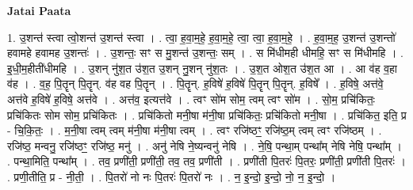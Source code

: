 \documentclass[17pt]{extarticle}
\begin{document}
\textbf{Jatai Paata} \newline

1. उ॒शन्त॑ स्त्वा त्वो॒शन्त॑ उ॒शन्त॑ स्त्वा । . त्वा॒ ह॒वा॒म॒हे॒ ह॒वा॒म॒हे॒ त्वा॒ त्वा॒ ह॒वा॒म॒हे॒ । . ह॒वा॒म॒ह॒ उ॒शन्त॑ उ॒शन्तो॑ हवामहे हवामह उ॒शन्तः॑ । . उ॒शन्तः॒ सꣳ स मु॒शन्त॑ उ॒शन्तः॒ सम् । . स मि॑धीमही धीमहि॒ सꣳ स मि॑धीमहि । . इ॒धी॒म॒हीती॑धीमहि । . उ॒शन् नु॑श॒त उ॑श॒त उ॒शन् नु॒शन् नु॑श॒तः । . उ॒श॒त ओश॒त उ॑श॒त आ । . आ व॑ह व॒हा व॑ह । . व॒ह॒ पि॒तॄन् पि॒तॄन्. व॑ह वह पि॒तॄन् । . पि॒तॄन्. ह॒विषे॑ ह॒विषे॑ पि॒तॄन् पि॒तॄन्. ह॒विषे᳚ । . ह॒विषे॒ अत्त॑वे॒ अत्त॑वे ह॒विषे॑ ह॒विषे॒ अत्त॑वे । . अत्त॑व॒ इत्यत्त॑वे । . त्वꣳ सो॑म सोम॒ त्वम् त्वꣳ सो॑म । . सो॒म॒ प्रचि॑कितः॒ प्रचि॑कितः सोम सोम॒ प्रचि॑कितः । . प्रचि॑कितो मनी॒षा म॑नी॒षा प्रचि॑कितः॒ प्रचि॑कितो मनी॒षा । . प्रचि॑कित॒ इति॒ प्र - चि॒कि॒तः॒ । . म॒नी॒षा त्वम् त्वम् म॑नी॒षा म॑नी॒षा त्वम् । . त्वꣳ रजि॑ष्ठꣳ॒॒ रजि॑ष्ठ॒म् त्वम् त्वꣳ रजि॑ष्ठम् । . रजि॑ष्ठ॒ मन्वनु॒ रजि॑ष्ठꣳ॒॒ रजि॑ष्ठ॒ मनु॑ । . अनु॑ नेषि ने॒ष्यन्वनु॑ नेषि । . ने॒षि॒ पन्था॒म् पन्था᳚म् नेषि नेषि॒ पन्था᳚म् । . पन्था॒मिति॒ पन्था᳚म् । . तव॒ प्रणी॑ती॒ प्रणी॑ती॒ तव॒ तव॒ प्रणी॑ती । . प्रणी॑ती पि॒तरः॑ पि॒तरः॒ प्रणी॑ती॒ प्रणी॑ती पि॒तरः॑ । . प्रणी॒तीति॒ प्र - नी॒ती॒ । . पि॒तरो॑ नो नः पि॒तरः॑ पि॒तरो॑ नः । . न॒ इ॒न्दो॒ इ॒न्दो॒ नो॒ न॒ इ॒न्दो॒ । \newline
\end{document}
